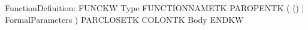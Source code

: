 %
%
%
\begin{rail}
FunctionDefinition: FUNCKW Type FUNCTIONNAMETK
                    PAROPENTK ( () | FormalParameters ) PARCLOSETK COLONTK Body ENDKW
\end{rail}
